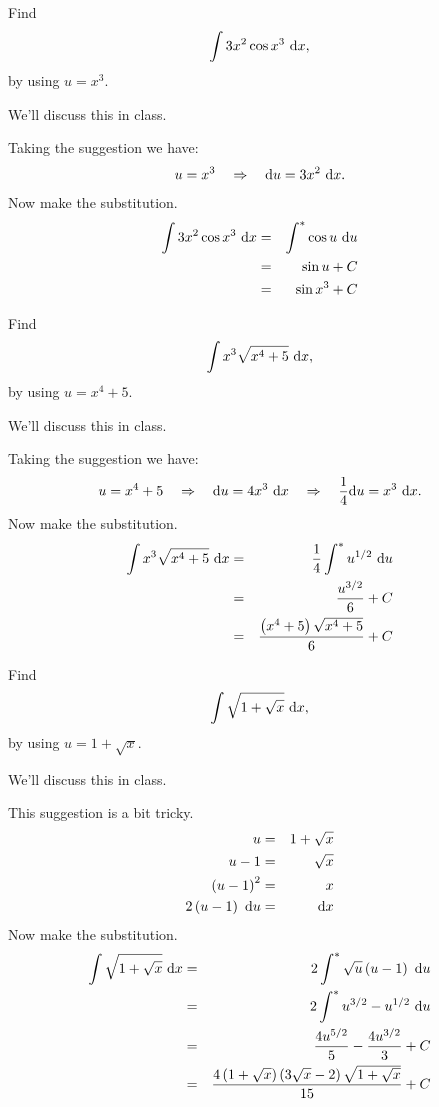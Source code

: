 \documentclass[12pt,addpoints, answers, fleqn]{exam}
\begin{document}
\begin{questions}
\question Find
\[
\int 3 x^2 \cos  x^3  \ {\rm{d}} x,
\]
by using $u = x^3$.

\begin{solution}
We'll discuss this in class.

Taking the suggestion we have:
\[
u = x^3 \quad \Rightarrow \quad {\rm{d}} u = 3x^2 \ {\rm{d}} x.
\]
Now make the substitution.
\begin{eqnarray*}
\int 3 x^2 \cos  x^3  \ {\rm{d}} x &=& \int^*  \cos  u \ {\rm{d}} u\\
&=& \sin  u + C\\
&=& \sin  x^3 + C
\end{eqnarray*}

\end{solution}

\question Find
\[
\int x^3 \sqrt{x^4 + 5} \ {\rm{d}} x,
\]
by using $u = x^4 + 5$.

\begin{solution}
We'll discuss this in class.

Taking the suggestion we have:
\[
u = x^4 + 5 \quad \Rightarrow \quad {\rm{d}} u = 4x^3 \ {\rm{d}} x \quad \Rightarrow \quad \frac{1}{4}{\rm{d}} u = x^3 \ {\rm{d}} x.
\]
Now make the substitution.
\begin{eqnarray*}
\int x^3 \sqrt{x^4 + 5} \ {\rm{d}} x &=& \frac{1}{4} \int^*  u^{1/2}\ {\rm{d}} u\\
&=& \frac{u^{3/2}}{6} + C\\
&=& \frac{\left(x^4 + 5\right) \sqrt{x^4 + 5}}{6} + C
\end{eqnarray*}

\end{solution}

\question Find
\[
\int \sqrt{1 + \sqrt{x}} \ {\rm{d}} x,
\]
by using $u = 1 + \sqrt{x}$.

\begin{solution}
We'll discuss this in class.

This suggestion is a bit tricky.
\begin{eqnarray*}
u &=& 1 + \sqrt{x}\\
u-1 &=& \sqrt{x}\\
\left(u-1\right)^2 &=& x\\
2\left(u-1\right) \  {\rm{d}} u &=& {\rm{d}} x\\
\end{eqnarray*}
Now make the substitution.
\begin{eqnarray*}
\int \sqrt{1 + \sqrt{x}} \ {\rm{d}} x &=& 2\int^*  \sqrt{u}\left(u-1\right) \ {\rm{d}} u\\
&=& 2\int^*  u^{3/2} - u^{1/2} \ {\rm{d}} u\\
&=& \frac{4u^{5/2}}{5} - \frac{4u^{3/2}}{3} + C\\
&=&  \frac{4\left(1 + \sqrt{x}\right)\left(3\sqrt{x}-2\right)\sqrt{1 + \sqrt{x}}}{15} + C
\end{eqnarray*}
\end{solution}







\end{questions}
\end{document}
